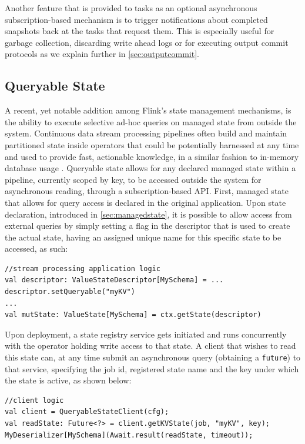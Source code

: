 Another feature that is provided to tasks as an optional asynchronous subscription-based mechanism is to trigger notifications about completed snapshots back at the tasks that request them. This is especially useful for garbage collection, discarding write ahead logs or for executing output commit protocols as we explain further in \autoref{sec:outputcommit}.

\subsection{Queryable State}

A recent, yet notable addition among Flink's state management mechanisms, is the ability to execute selective ad-hoc queries on managed state from outside the system. Continuous data stream processing pipelines often build and maintain partitioned state inside operators that could be potentially harnessed at any time and used to provide fast, actionable knowledge, in a similar fashion to in-memory database usage \cite{kipfanalytics}. Queryable state allows for any declared managed state within a pipeline, currently scoped by key, to be accessed outside the system for asynchronous reading, through a subscription-based API. First, managed state that allows for query access is declared in the original application. Upon state declaration, introduced in \autoref{sec:managedstate}, it is possible to allow access from external queries by simply setting a flag in the descriptor that is used to create the actual state, having an assigned unique name for this specific state to be accessed, as such:

\begin{lstlisting}[style=scala]
//stream processing application logic
val descriptor: ValueStateDescriptor[MySchema] = ...
descriptor.setQueryable("myKV")
...
val mutState: ValueState[MySchema] = ctx.getState(descriptor)
\end{lstlisting}

\para{} Upon deployment, a state registry service gets initiated and runs concurrently with the operator holding write access to that state. A client that wishes to read this state can, at any time submit an asynchronous query (obtaining a \texttt{future}) to that service, specifying the job id, registered state name and the key under which the state is active, as shown below:

\begin{lstlisting}[style=scala]
//client logic
val client = QueryableStateClient(cfg);
val readState: Future<?> = client.getKVState(job, "myKV", key);
MyDeserializer[MySchema](Await.result(readState, timeout));
\end{lstlisting}


